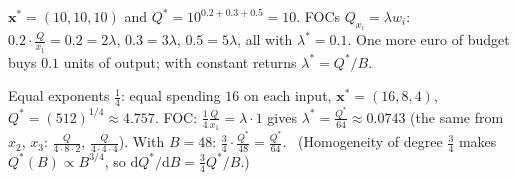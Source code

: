 \begin{solutions}
        $\mathbf{x}^*=(10,10,10)$ and $Q^*=10^{0.2+0.3+0.5}=10$. FOCs
        $Q_{x_i}=\lambda w_i$: $0.2\cdot\tfrac{Q}{x_1}=0.2=2\lambda$,
        $0.3=3\lambda$, $0.5=5\lambda$, all with $\lambda^*=0.1$. One more
        euro of budget buys $0.1$ units of output; with constant returns
        $\lambda^*=Q^*/B$.
  \item Equal exponents $\tfrac14$: equal spending $16$ on each input,
        $\mathbf{x}^*=(16,8,4)$, $Q^*=(512)^{1/4}\approx4.757$. FOC:
        $\tfrac14\tfrac{Q}{x_1}=\lambda\cdot1$ gives
        $\lambda^*=\tfrac{Q^*}{64}\approx0.0743$ (the same from $x_2$, $x_3$:
        $\tfrac{Q}{4\cdot8\cdot2}$, $\tfrac{Q}{4\cdot4\cdot4}$). With
        $B=48$: $\tfrac34\cdot\tfrac{Q^*}{48}=\tfrac{Q^*}{64}$. \checkmark\
        (Homogeneity of degree $\tfrac34$ makes $Q^*(B)\propto B^{3/4}$, so
        $\mathrm{d}Q^*/\mathrm{d}B=\tfrac34Q^*/B$.)
\end{solutions}
